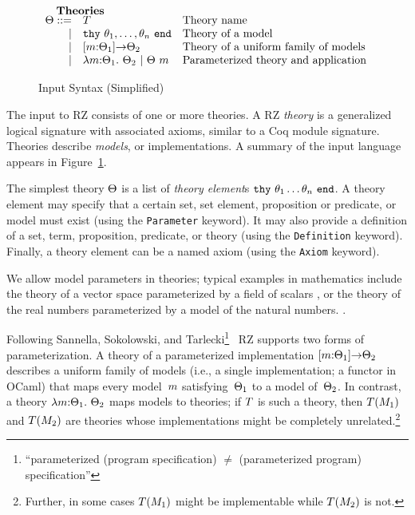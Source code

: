 \begin{figure}
\[\begin{array}{rl@{\quad}l}
  		\noalign{\textbf{Theories}}
		\ith ::= 
		     & \iTH&\mbox{Theory name}\\
		   	| & \ithy{\ite_1,\ldots,\ite_n} &\mbox{Theory of a model}\\
		 	| & \idarrow{\iM}{\ith_1}{\ith_2} &\mbox{Theory of a uniform family of models}\\
		  	| & \ilambda{\iM}{\ith_1}{\ith_2} \ibar 
		      \iapp{\ith}{\iM}&\mbox{Parameterized theory and application}\\
	\end{array}
	\]
	\label{fig:input}
	\caption{Input Syntax (Simplified)}
\end{figure}
\fi %

The input to RZ consists of one or more theories.
A RZ \emph{theory} is a generalized logical signature with associated
axioms, similar to a Coq module signature. Theories describe
\emph{models}, or implementations. 
\iflong
A summary of the input language appears in Figure~\ref{fig:input}.
\fi %

The simplest theory $\Theta$ is a list of \emph{theory element}\/s
$\mathtt{thy}\ \theta_1 \ldots \theta_n\ \mathtt{end}$. A theory element may specify that a certain
set, set element, proposition or predicate, or model must exist (using
the 
\texttt{Parameter} keyword). It may also provide a definition
of a set, term, proposition, predicate, or theory (using the 
\texttt{Definition} keyword). Finally, a theory element can be
a named axiom (using the \texttt{Axiom} keyword).

We allow model parameters in theories; 
typical examples in mathematics include
the theory of a vector space parameterized by a field of scalars%
\iflong
, or the theory of the real numbers parameterized by a model of the
natural numbers.
\else %
.
\fi %

\iflong
Following Sannella, Sokolowski, and 
Tarlecki\footnote{``parameterized (program specification) $\neq$ (parameterized program) specification''}~\cite{sannella92:_towar}
RZ supports two forms of parameterization.  
\fi %
A theory of a parameterized implementation
$[m{:}\Theta_1]{\to}\Theta_2$ describes a uniform family of models (i.e.,
a single implementation; a functor in OCaml) that maps every
model~$m$ satisfying~$\Theta_1$ to a model of~$\Theta_2$.  In contrast,
a theory $\lambda m{:}\Theta_1.\ \Theta_2$
maps models to theories; if $T$ is such a theory, then
$T(M_1)$ and $T(M_2)$ are theories whose implementations might be completely unrelated.\iflong\footnote{
Further, in some cases $T(M_1)$ might be implementable while $T(M_2)$ is not.
}
\fi %


